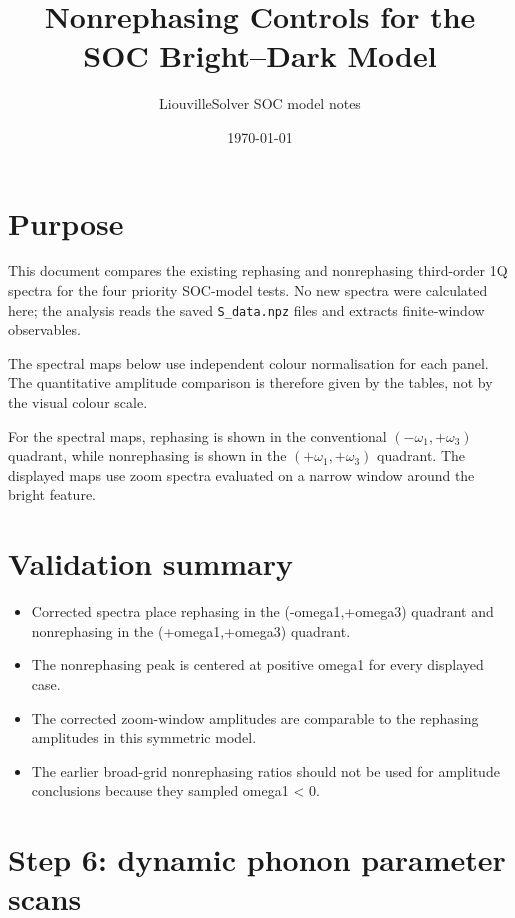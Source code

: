 \documentclass[11pt]{article}
\title{Nonrephasing Controls for the SOC Bright--Dark Model}
\author{LiouvilleSolver SOC model notes}
\date{\today}
\begin{document}
\maketitle

\section{Purpose}

This document compares the existing rephasing and nonrephasing third-order 1Q spectra for the four priority SOC-model tests.  No new spectra were calculated here; the analysis reads the saved \texttt{S\_data.npz} files and extracts finite-window observables.

The spectral maps below use independent colour normalisation for each panel.  The quantitative amplitude comparison is therefore given by the tables, not by the visual colour scale.

For the spectral maps, rephasing is shown in the conventional $(-\omega_1,+\omega_3)$ quadrant, while nonrephasing is shown in the $(+\omega_1,+\omega_3)$ quadrant.  The displayed maps use zoom spectra evaluated on a narrow window around the bright feature.

\section{Validation summary}

\begin{itemize}

\item Corrected spectra place rephasing in the (-omega1,+omega3) quadrant and nonrephasing in the (+omega1,+omega3) quadrant.

\item The nonrephasing peak is centered at positive omega1 for every displayed case.

\item The corrected zoom-window amplitudes are comparable to the rephasing amplitudes in this symmetric model.

\item The earlier broad-grid nonrephasing ratios should not be used for amplitude conclusions because they sampled omega1 < 0.

\end{itemize}

\section{Step 6: dynamic phonon parameter scans}
\end{document}
